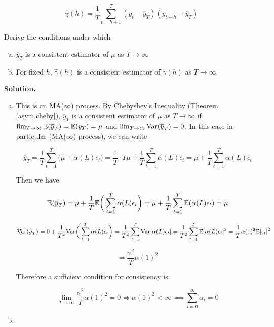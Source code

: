 \[
\hat{\gamma}(h) = \frac{1}{T} \sum_{t=h+1}^T(y_t - \overline{y}_T)(y_{t-h} - \overline{y}_T)
\]

Derive the conditions under which

\begin{enumerate}[(a)]

\item \(\overline{y}_T\) is a consistent estimator of \(\mu\) as \(T \to \infty\)

\item For fixed \(h\), \(\hat{\gamma}(h)\) is a consistent estimator of \(\gamma(h)\) as \(T \to \infty\).

\end{enumerate}

\textbf{Solution.}

\begin{enumerate}[(a)]

\item 
This is an MA(\(\infty\)) process. By Chebyshev's Inequality (Theorem \ref{asym.cheby}), \(\overline{y}_T\) is a consistent estimator of \(\mu\) as \(T \to \infty\) if \(\lim_{T \to \infty} \mathbb{E}(\overline{y}_T) = \mathbb{E}(y_T) = \mu\) and \(\lim_{T \to \infty} \mathrm{Var}(\overline{y}_T) = 0\). In this case in particular (MA(\(\infty\)) process), we can write

\[
\overline{y}_T = \frac{1}{T} \sum_{t=1}^T \big( \mu + \alpha(L)\epsilon_t \big) = \frac{1}{T}\cdot T \mu + \frac{1}{T} \sum_{t=1}^T \alpha(L)\epsilon_t = \mu + \frac{1}{T}\sum_{t=1}^T \alpha(L)\epsilon_t 
\]

Then we have

\[
\mathbb{E}(\overline{y}_T) = \mu + \frac{1}{T}\mathbb{E} \bigg( \sum_{t=1}^T \alpha(L)\epsilon_t  \bigg)  = \mu + \frac{1}{T} \sum_{t=1}^T  \mathbb{E} ( \alpha(L)\epsilon_t  ) = \mu
\]

\[
\mathrm{Var}(\overline{y}_T) = 0 + \frac{1}{T^2} \mathrm{Var} \bigg( \sum_{t=1}^T \alpha(L)\epsilon_t  \bigg) = \frac{1}{T^2} \sum_{t=1}^T \mathrm{Var}[ \alpha(L)\epsilon_t ] = \frac{1}{T^2} \sum_{t=1}^T \mathbb{E}[ \alpha(L)\epsilon_t ] ^2 = \frac{1}{T} \alpha(1)^2 \mathbb{E}[\epsilon_t ] ^2
\]

\[
= \frac{\sigma^2}{T} \alpha(1)^2
\]

Therefore a sufficient condition for consistency is 

\[
\lim_{T \to \infty}  \frac{\sigma^2}{T} \alpha(1)^2 = 0 \iff \alpha(1)^2 < \infty \impliedby \boxed{\sum_{i=0}^\infty \alpha_i = 0}
\]

\item 


\end{enumerate}
